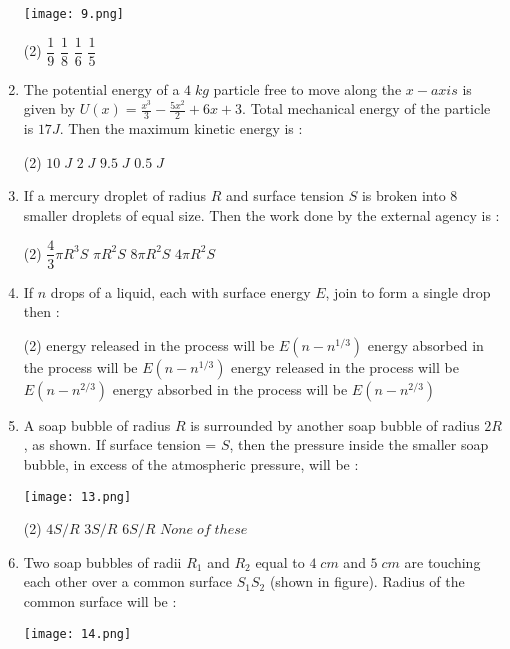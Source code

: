 \documentclass{article}
\begin{document}
\begin{enumerate}
\texttt{[image: 9.png]}

\begin{tasks}(2)
\task \(\dfrac{1}{9}\) \vspace{0.2 cm}
\task \(\dfrac{1}{8}\)
\task \(\dfrac{1}{6}\)
\task \(\dfrac{1}{5}\)
\end{tasks}
\item The potential energy of a \(4\;kg\) particle free to move along the \(x-axis\) is given by \(U(x)= \displaystyle  \frac {x^ {3}}{3} - \frac {5x^ {2}}{2}  +6x +3\). Total mechanical energy of the particle is \(17 J\). Then the maximum kinetic energy is :
\begin{tasks}(2)
\task \(10\;J\)
\task \(2\;J\)
\task \(9.5\;J\)
\task \(0.5\;J\)
\end{tasks}
\item If a mercury droplet of radius \(R\) and surface tension \(S\) is broken into 8 smaller droplets of equal size. Then the work done by the external agency is :
\begin{tasks}(2)
\task \( \dfrac{4}{3} \pi R^3 S \)
\task \(\pi R^2 S \)
\task \(8\pi R^2 S \)
\task \( 4\pi R^2 S \)
\end{tasks}
\item If \(n\) drops of a liquid, each with surface energy \(E\), join to form a single drop then :
\begin{tasks}(2)
\task energy released in the process will be \(E(n-n^{1/3})\)
\task energy absorbed in the process will be \(E(n-n^{1/3})\)
\task energy released in the process will be \(E(n-n^{2/3})\)
\task energy absorbed in the process will be \(E(n-n^{2/3})\)
\end{tasks}
\item A soap bubble of radius \(R\) is surrounded by another soap bubble of radius \(2R\), as shown. If surface tension = \(S\), then the pressure inside the smaller soap bubble, in excess of the atmospheric pressure, will be :

\texttt{[image: 13.png]}

\begin{tasks}(2)
\task \(4S/R\)
\task \(3S/R\)
\task \(6S/R\)
\task \(None \; of \; these\)
\end{tasks}
\item Two soap bubbles of radii \(R_1\) and \(R_2\) equal to \(4\; cm\) and \(5\;cm\) are touching each other over a common surface \(S_1S_2\) (shown in figure). Radius of the common surface will be :

\texttt{[image: 14.png]}


\end{enumerate}
\end{document}
